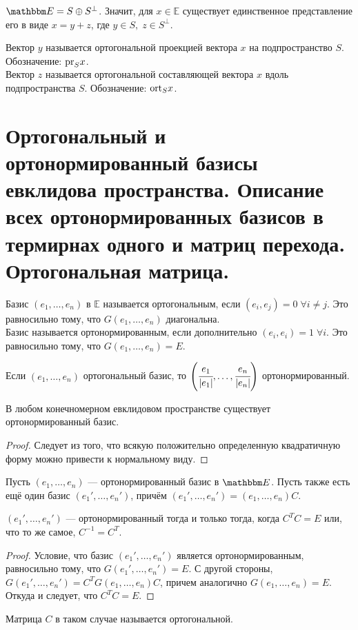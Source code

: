 $\E = S \oplus S^\perp$. Значит, для $x \in \mathbb{E}$ существует единственное представление его в виде $x = y + z$, где $y \in S,\; z \in S^\perp$.
\begin{Def}
	Вектор $y$ называется ортогональной проекцией вектора $x$ на подпространство $S$. Обозначение: $\mathrm{pr}_S x$. \\ Вектор $z$ называется ортогональной составляющей вектора $x$ вдоль подпространства $S$. Обозначение: $\mathrm{ort}_S x$.
\end{Def}


\section{Ортогональный и ортонормированный базисы евклидова пространства. Описание всех ортонормированных базисов в термирнах одного и матриц перехода. Ортогональная матрица.}

\begin{Def}
	Базис $(e_1, \ldots, e_n)$ в $\mathbb{E}$ называется ортогональным, если $(e_i, e_j) = 0\; \forall i\neq j$. Это равносильно тому, что $G(e_1, \ldots, e_n)$ диагональна. \\Базис называется ортонормированным, если дополнительно $(e_i, e_i) = 1\; \forall i$. Это равносильно тому, что $G(e_1, \ldots, e_n) = E$.
\end{Def}
\begin{Comment}
	Если $(e_1,\ldots, e_n)$ ортогональный базис, то $\left(\cfrac{e_1}{|e_1|}, \ldots, \cfrac{e_n}{|e_n|}\right)$ ортонормированный.
\end{Comment}
\begin{Theorem}
	В любом конечномерном евклидовом пространстве существует ортонормированный базис.
\end{Theorem}
\begin{proof}
	Следует из того, что всякую положительно определенную квадратичную форму можно привести к нормальному виду. 
\end{proof}
Пусть $(e_1, \ldots, e_n)$ --- ортонормированный базис в $\E$. Пусть также есть ещё один базис $(e_1', \ldots, e_n')$, причём $(e_1', \ldots, e_n') = (e_1, \ldots, e_n)C$. 
\begin{Suggestion}
	$(e_1', \ldots, e_n')$ --- ортонормированный тогда и только тогда, когда $C^TC = E$ или, что то же самое, $C^{-1} = C^T$.
\end{Suggestion}
\begin{proof}
	Условие, что базис $(e_1', \ldots, e_n')$ является ортонормированным, равносильно тому, что $G(e_1', \ldots, e_n') = E$. С другой стороны, $G(e_1', \ldots, e_n') = C^TG(e_1, \ldots, e_n)C$, причем аналогично $G(e_1, \ldots, e_n) = E$. Откуда и следует, что $C^TC = E$.
\end{proof}
\begin{Def}
	Матрица $C$ в таком случае называется ортогональной.
\end{Def}


